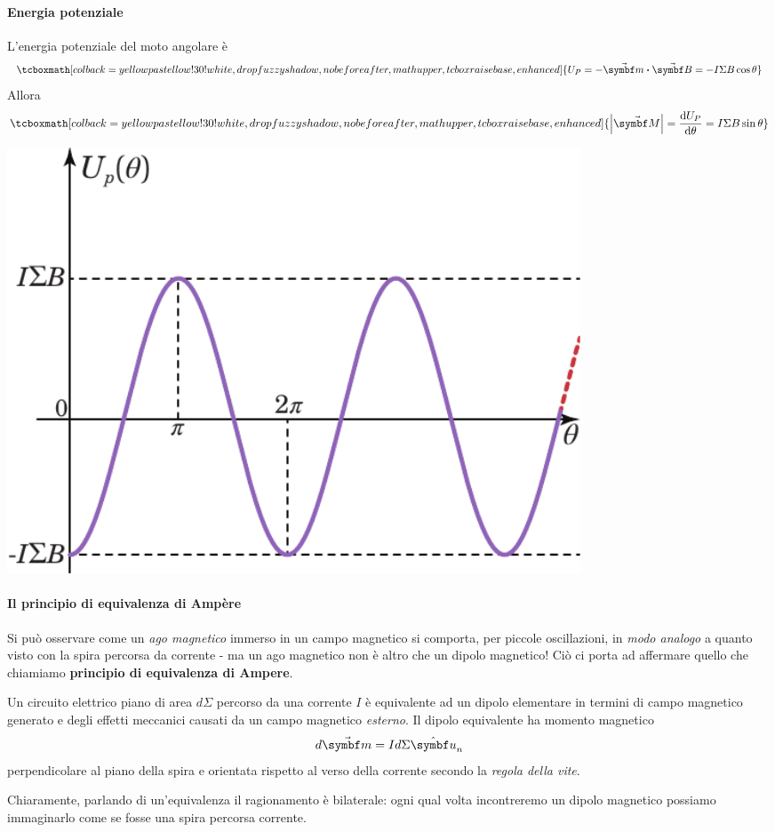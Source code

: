 \paragraph{Energia potenziale}
L'energia potenziale del moto angolare è
\begin{equation}
	\tcboxmath[colback=yellowpastellow!30!white,drop fuzzy shadow, nobeforeafter, math upper, tcbox raise base, enhanced]{U_P=-\vba{m}\vdot\vba{B}=-I\Sigma B\cos\theta}
\end{equation}
Allora
\begin{equation}
	\tcboxmath[colback=yellowpastellow!30!white,drop fuzzy shadow, nobeforeafter, math upper, tcbox raise base, enhanced]{\abs{\vba{M}}=\dv{U_P}{\theta}=I\Sigma B\sin\theta}
\end{equation}\label{EnergiaPotenzialeCasoGeneralemanontroppo}
\begin{center}
	\includegraphics[width=0.75\textwidth]{images/chp7/chp7graficoenergiapot.pdf}
\end{center}
\paragraph{Il principio di equivalenza di Ampère}\label{principio di equivalenza di ampere}
Si può osservare come un \textit{ago magnetico} immerso in un campo magnetico si comporta, per piccole oscillazioni, in \textit{modo analogo} a quanto visto con la spira percorsa da corrente - ma un ago magnetico non è altro che un dipolo magnetico! Ciò ci porta ad affermare quello che chiamiamo \textbf{principio di equivalenza di Ampere}.
\begin{principle}
	Un circuito elettrico piano di area $d\Sigma$ percorso da una corrente $I$ è equivalente ad un dipolo elementare in termini di campo magnetico generato e degli effetti meccanici causati da un campo magnetico \textit{esterno}. Il dipolo equivalente ha momento magnetico
	\begin{equation}
		d\vba{m}=Id\Sigma \vbh{u}_n
	\end{equation}
	perpendicolare al piano della spira e orientata rispetto al verso della corrente secondo la \textit{regola della vite}.
\end{principle}
Chiaramente, parlando di un'equivalenza il ragionamento è bilaterale: ogni qual volta incontreremo un dipolo magnetico possiamo immaginarlo come se fosse una spira percorsa corrente.
